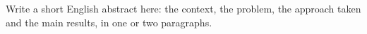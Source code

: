 Write a short English abstract here: the context, the problem, the approach
taken and the main results, in one or two paragraphs.
